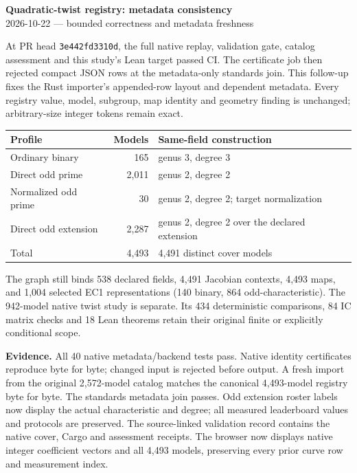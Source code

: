 \documentclass[10pt]{article}
\begin{document}
\begin{center}
{\Large\bfseries Quadratic-twist registry: metadata consistency}\\[5pt]
2026-10-22 \quad --- \quad bounded correctness and metadata freshness
\end{center}

At PR head \texttt{3e442fd3310d}, the full native replay, validation gate,
catalog assessment and this study's Lean target passed CI. The certificate job
then rejected compact JSON rows at the metadata-only standards join. This
follow-up fixes the Rust importer's appended-row layout and dependent metadata.
Every registry value, model, subgroup, map identity and geometry finding is
unchanged; arbitrary-size integer tokens remain exact.

\begin{center}
\begin{tabular}{lrl}
\toprule
Profile & Models & Same-field construction \\
\midrule
Ordinary binary & 165 & genus 3, degree 3 \\
Direct odd prime & 2,011 & genus 2, degree 2 \\
Normalized odd prime & 30 & genus 2, degree 2; target normalization \\
Direct odd extension & 2,287 & genus 2, degree 2 over the declared extension \\
\midrule
Total & 4,493 & 4,491 distinct cover models \\
\bottomrule
\end{tabular}
\end{center}

The graph still binds 538 declared fields, 4,491 Jacobian contexts, 4,493 maps,
and 1,004 selected EC1 representations (140 binary, 864 odd-characteristic).
The 942-model native twist study is separate. Its 434 deterministic comparisons,
84 IC matrix checks and 18 Lean theorems retain their original finite or
explicitly conditional scope.

\textbf{Evidence.} All 40 native metadata/backend tests pass. Native identity
certificates reproduce byte for byte; changed input is rejected before output.
A fresh import from the original 2,572-model catalog matches the canonical
4,493-model registry byte for byte. The standards metadata join passes. Odd
extension roster labels now display the actual characteristic and degree;
all measured leaderboard values and protocols are preserved. The source-linked
validation record contains the native cover, Cargo and assessment receipts.
The browser now displays native integer coefficient vectors and all 4,493
models, preserving every prior curve row and measurement index.
\end{document}
